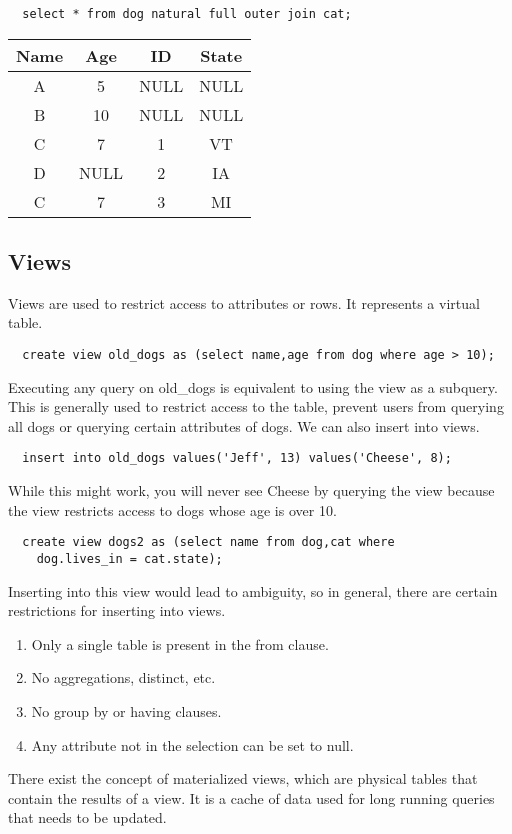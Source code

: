 \documentclass{math}
\begin{document}
\begin{lstlisting}
  select * from dog natural full outer join cat;
\end{lstlisting}
\begin{center}
  \begin{tabular}{|c|c|c|c|}
    \hline
    Name & Age & ID & State \\
    \hline
    A & 5 & NULL & NULL \\
    B & 10 & NULL & NULL \\
    C & 7 & 1 & VT \\
    D & NULL & 2 & IA \\
    C & 7 & 3 & MI \\
    \hline
  \end{tabular}
\end{center}

\subsection*{Views}
Views are used to restrict access to attributes or rows. It represents a virtual
table.
\begin{lstlisting}
  create view old_dogs as (select name,age from dog where age > 10);
\end{lstlisting}
Executing any query on old\_dogs is equivalent to using the view as a subquery.
This is generally used to restrict access to the table, prevent users from
querying all dogs or querying certain attributes of dogs. We can also insert
into views.
\begin{lstlisting}
  insert into old_dogs values('Jeff', 13) values('Cheese', 8);
\end{lstlisting}
While this might work, you will never see Cheese by querying the view because
the view restricts access to dogs whose age is over 10.
\begin{lstlisting}
  create view dogs2 as (select name from dog,cat where
    dog.lives_in = cat.state);
\end{lstlisting}
Inserting into this view would lead to ambiguity, so in general, there are
certain restrictions for inserting into views.
\begin{enumerate}
  \item Only a single table is present in the from clause.
  \item No aggregations, distinct, etc.
  \item No group by or having clauses.
  \item Any attribute not in the selection can be set to null.
\end{enumerate}
There exist the concept of materialized views, which are physical tables that
contain the results of a view. It is a cache of data used for long running
queries that needs to be updated.
\end{document}
